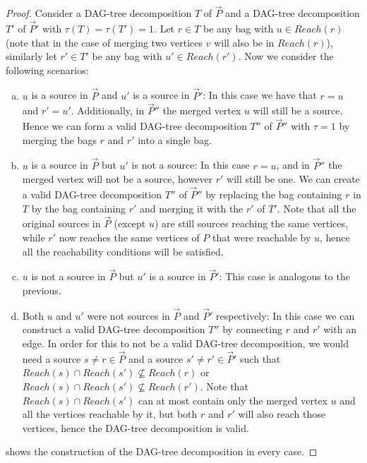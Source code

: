 \documentclass[a4paper,UKenglish,cleveref, autoref, numberwithinsect, thm-restate]{lipics-v2021}
\newcommand{\Reachable}{Reach}
\newcommand{\dtw}{\tau}
\newcommand{\dagtree}{DAG-tree decomposition}
\begin{document}
	\begin{proof}
		Consider a \dagtree{} $T$ of $\vec{P}$ and a \dagtree{} $T'$ of $\vec{P}'$ with $\dtw(T)=\dtw(T')=1$. Let $r \in T$ be any bag with $u \in \Reachable(r)$ (note that in the case of merging two vertices $v$ will also be in $\Reachable(r)$), similarly let $r' \in T'$ be any bag with $u' \in \Reachable(r')$. Now we consider the following scenarios:
		
		\begin{enumerate}[a)]
			\item $u$ is a source in $\vec{P}$ and $u'$ is a source in $\vec{P}'$: In this case we have that $r=u$ and $r'=u'$. Additionally, in $\vec{P}''$ the merged vertex $u$ will still be a source. Hence we can form a valid \dagtree{} $T''$ of $\vec{P}''$ with $\dtw=1$ by merging the bags $r$ and $r'$ into a single bag.
			
			\item $u$ is a source in $\vec{P}$ but $u'$ is not a source: In this case $r=u$, and in $\vec{P}''$ the merged vertex will not be a source, however $r'$ will still be one. We can create a valid \dagtree{} $T''$ of $\vec{P}''$ by replacing the bag containing $r$ in $T$ by the bag containing $r'$ and merging it with the $r'$ of $T'$. Note that all the original sources in $\vec{P}$ (except $u$) are still sources reaching the same vertices, while $r'$ now reaches the same vertices of $P$ that were reachable by $u$, hence all the reachability conditions will be satisfied.
			
			\item $u$ is not a source in $\vec{P}$ but $u'$ is a source in $\vec{P}'$: This case is analogous to the previous.
			
			\item Both $u$ and $u'$ were not sources in $\vec{P}$ and $\vec{P}'$ respectively: In this case we can construct a valid \dagtree{} $T''$ by connecting $r$ and $r'$ with an edge. In order for this to not be a valid \dagtree{}, we would need a source $s\neq r \in \vec{P}$ and a source $s' \neq r' \in \vec{P}'$ such that $\Reachable(s) \cap \Reachable(s') \not\subseteq \Reachable(r)$ or $\Reachable(s) \cap \Reachable(s') \not\subseteq \Reachable(r')$. Note that $\Reachable(s) \cap \Reachable(s')$ can at most contain only the merged vertex $u$ and all the vertices reachable by it, but both $r$ and $r'$ will also reach those vertices, hence the \dagtree{} is valid.
		\end{enumerate}
		 shows the construction of the \dagtree{} in every case.
	\end{proof}
	
\end{document}
